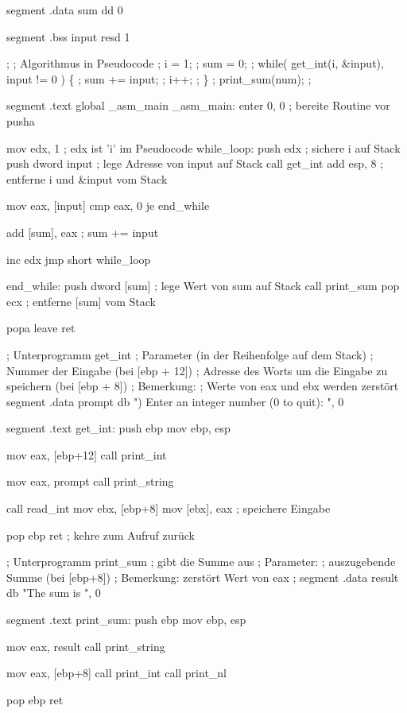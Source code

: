 \begin{AsmCodeListing}[label=sub3.asm, numbers=left, commandchars=\\\{\}]

 segment .data
 sum     dd   0

 segment .bss
 input   resd 1

 ;
 ; Algorithmus in Pseudocode
 ; i = 1;
 ; sum = 0;
 ; while( get_int(i, &input), input != 0 ) \{
 ;   sum += input;
 ;   i++;
 ; \}
 ; print_sum(num);
 ;
 
 segment .text
         global  _asm_main
 _asm_main:
         enter   0, 0              ; bereite Routine vor
         pusha

         mov     edx, 1            ; edx ist 'i' im Pseudocode
 while_loop:
         push    edx               ; sichere i auf Stack
         push    dword input       ; lege Adresse von input auf Stack
         call    get_int
         add     esp, 8            ; entferne i und &input vom Stack

         mov     eax, [input]
         cmp     eax, 0
         je      end_while

         add     [sum], eax        ; sum += input

         inc     edx
         jmp     short while_loop

 end_while:
         push    dword [sum]       ; lege Wert von sum auf Stack
         call    print_sum
         pop     ecx               ; entferne [sum] vom Stack

         popa
         leave
         ret

 ; Unterprogramm get_int
 ; Parameter (in der Reihenfolge auf dem Stack)
 ;   Nummer der Eingabe (bei [ebp + 12])
 ;   Adresse des Worts um die Eingabe zu speichern (bei [ebp + 8])
 ; Bemerkung:
 ;   Werte von eax und ebx werden zerst\"{o}rt
 segment .data
 prompt  db      ") Enter an integer number (0 to quit): ", 0

 segment .text                      \label{line:sub3.asm}
 get_int:
         push    ebp
         mov     ebp, esp

         mov     eax, [ebp+12]
         call    print_int

         mov     eax, prompt
         call    print_string

         call    read_int
         mov     ebx, [ebp+8]
         mov     [ebx], eax         ; speichere Eingabe

         pop     ebp
         ret                        ; kehre zum Aufruf zur\"{u}ck

 ; Unterprogramm print_sum
 ; gibt die Summe aus
 ; Parameter:
 ;   auszugebende Summe (bei [ebp+8])
 ; Bemerkung: zerst\"{o}rt Wert von eax
 ;
 segment .data
 result  db      "The sum is ", 0

 segment .text
 print_sum:
         push    ebp
         mov     ebp, esp

         mov     eax, result
         call    print_string

         mov     eax, [ebp+8]
         call    print_int
         call    print_nl

         pop     ebp
         ret
\end{AsmCodeListing}


